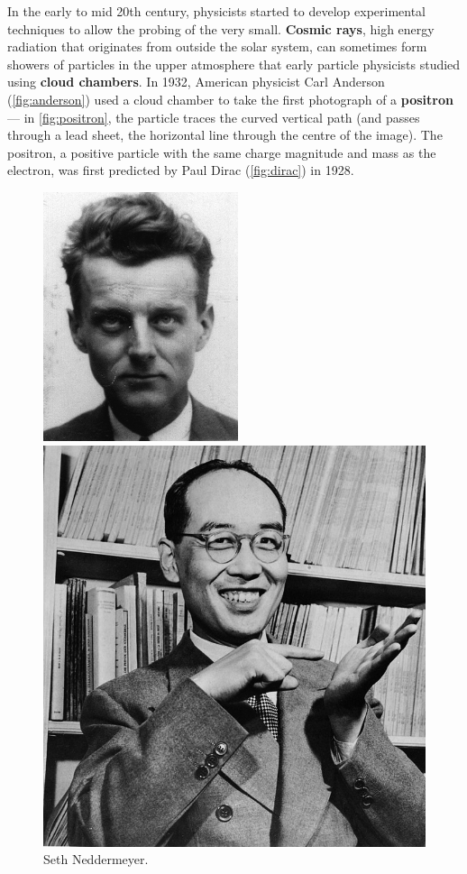 \documentclass[a4paper]{amsbook}
\theoremstyle{definition}
\numberwithin{exercise}{chapter}
\numberwithin{exercise}{chapter}
\begin{document}
In the early to mid 20th century, physicists started to develop experimental techniques to allow the probing of the very small. \textbf{Cosmic rays},
high energy radiation that originates from outside the solar system, can sometimes form showers of particles in the upper atmosphere that early particle
physicists studied using \textbf{cloud chambers}. In 1932, American physicist Carl Anderson (\cref{fig:anderson}) used a cloud chamber to take the
first photograph of a \textbf{positron} --- in \cref{fig:positron}, the particle traces the curved vertical path (and passes through a lead sheet, the horizontal
line through the centre of the image). The positron, a positive particle with the same charge magnitude and mass as the electron, was first predicted
by Paul Dirac (\cref{fig:dirac}) in 1928.

\begin{figure}
  \centering
  \begin{minipage}{0.45\textwidth}
    \centering
    \includegraphics[height=0.2\textheight]{neddermeyer}
    \caption{Seth Neddermeyer. \label{fig:neddermeyer}}
  \end{minipage}\hfill
  \begin{minipage}{0.45\textwidth}
    \centering
    \includegraphics[height=0.2\textheight]{yukawa}

\end{minipage}
\end{figure}
\end{document}
